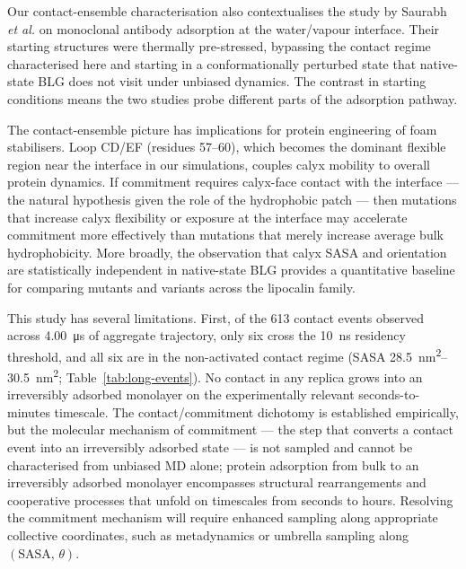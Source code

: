 \documentclass[11pt,a4paper]{article}
\begin{document}
Our contact-ensemble characterisation also contextualises the study by
Saurabh \textit{et al.}\citep{Saurabh2024} on monoclonal antibody
adsorption at the water/vapour interface. Their starting structures were
thermally pre-stressed, bypassing the contact regime characterised here
and starting in a conformationally perturbed state that native-state BLG
does not visit under unbiased dynamics. The contrast in starting
conditions means the two studies probe different parts of the adsorption
pathway.

The contact-ensemble picture has implications for protein engineering of
foam stabilisers. Loop CD/EF (residues 57--60), which becomes the dominant
flexible region near the interface in our simulations, couples calyx
mobility to overall protein dynamics. If commitment requires calyx-face
contact with the interface --- the natural hypothesis given the role of
the hydrophobic patch --- then mutations that increase calyx flexibility
or exposure at the interface may accelerate commitment more effectively
than mutations that merely increase average bulk hydrophobicity. More
broadly, the observation that calyx SASA and orientation are
statistically independent in native-state BLG provides a quantitative
baseline for comparing mutants and variants across the lipocalin
family\citep{Flower1996,Papiz1986}.

This study has several limitations. First, of the \num{613} contact
events observed across \SI{4.00}{\micro\second} of aggregate trajectory,
only six cross the \SI{10}{\nano\second} residency threshold, and all
six are in the non-activated contact regime (SASA
\SIrange{28.5}{30.5}{\nano\metre\squared}; Table~\ref{tab:long-events}).
No contact in any replica grows into an irreversibly adsorbed monolayer
on the experimentally relevant seconds-to-minutes
timescale\citep{Cornec1999,Ulaganathan2017a}. The contact/commitment
dichotomy is established empirically, but the molecular mechanism of
commitment --- the step that converts a contact event into an irreversibly
adsorbed state --- is not sampled and cannot be characterised from
unbiased MD alone; protein adsorption from bulk to an irreversibly
adsorbed monolayer encompasses structural rearrangements and cooperative
processes that unfold on timescales from seconds to hours\citep{Rabe2011}.
Resolving the commitment mechanism will require enhanced sampling along
appropriate collective coordinates, such as metadynamics or umbrella
sampling along $(\mathrm{SASA},\,\theta)$.
\end{document}
